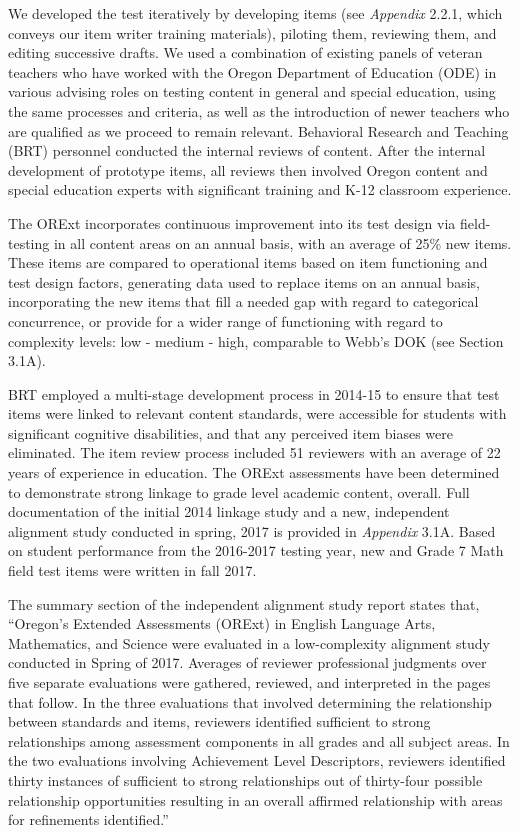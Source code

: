 \documentclass[]{article}
\begin{document}
We developed the test iteratively by developing items (see
\emph{Appendix} 2.2.1, which conveys our item writer training
materials), piloting them, reviewing them, and editing successive
drafts. We used a combination of existing panels of veteran teachers who
have worked with the Oregon Department of Education (ODE) in various
advising roles on testing content in general and special education,
using the same processes and criteria, as well as the introduction of
newer teachers who are qualified as we proceed to remain relevant.
Behavioral Research and Teaching (BRT) personnel conducted the internal
reviews of content. After the internal development of prototype items,
all reviews then involved Oregon content and special education experts
with significant training and K-12 classroom experience.

The ORExt incorporates continuous improvement into its test design via
field-testing in all content areas on an annual basis, with an average
of 25\% new items. These items are compared to operational items based
on item functioning and test design factors, generating data used to
replace items on an annual basis, incorporating the new items that fill
a needed gap with regard to categorical concurrence, or provide for a
wider range of functioning with regard to complexity levels: low -
medium - high, comparable to Webb's DOK (see Section 3.1A).

BRT employed a multi-stage development process in 2014-15 to ensure that
test items were linked to relevant content standards, were accessible
for students with significant cognitive disabilities, and that any
perceived item biases were eliminated. The item review process included
51 reviewers with an average of 22 years of experience in education. The
ORExt assessments have been determined to demonstrate strong linkage to
grade level academic content, overall. Full documentation of the initial
2014 linkage study and a new, independent alignment study conducted in
spring, 2017 is provided in \emph{Appendix} 3.1A. Based on student
performance from the 2016-2017 testing year, new and Grade 7 Math field
test items were written in fall 2017.

The summary section of the independent alignment study report states
that, ``Oregon's Extended Assessments (ORExt) in English Language Arts,
Mathematics, and Science were evaluated in a low-complexity alignment
study conducted in Spring of 2017. Averages of reviewer professional
judgments over five separate evaluations were gathered, reviewed, and
interpreted in the pages that follow. In the three evaluations that
involved determining the relationship between standards and items,
reviewers identified sufficient to strong relationships among assessment
components in all grades and all subject areas. In the two evaluations
involving Achievement Level Descriptors, reviewers identified thirty
instances of sufficient to strong relationships out of thirty-four
possible relationship opportunities resulting in an overall affirmed
relationship with areas for refinements identified.''
\end{document}
